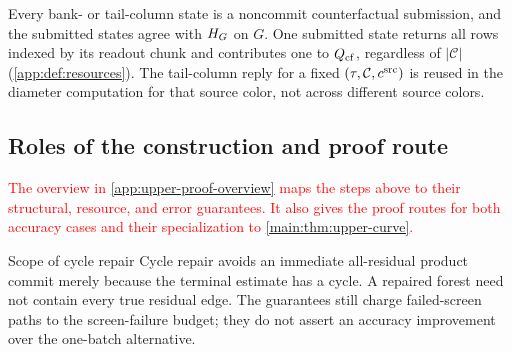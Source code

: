 Every bank- or tail-column state is a noncommit counterfactual submission, and the
submitted states agree with $H_{G}$ on $G$.  One submitted state returns all
rows indexed by its readout chunk and contributes one to
$Q_{\mathrm{cf}}$, regardless of $|\mathcal C|$
(\textcolor{red}{\cref{app:def:resources}}). The
tail-column reply for a fixed $(\tau,\mathcal C,c^{\mathrm{src}})$ is reused in the
diameter computation for that source color, not across different source colors.

\subsection{Roles of the construction and proof route}
\label{app:algorithm-proof-route}

\textcolor{red}{The overview in \cref{app:upper-proof-overview} maps the steps above
to their structural, resource, and error guarantees. It also gives the proof
routes for both accuracy cases and their specialization to
\cref{main:thm:upper-curve}.}

\begin{proposalcontext}{Scope of cycle repair}
Cycle repair avoids an immediate all-residual product commit merely because
the terminal estimate has a cycle. A repaired forest need not contain every
true residual edge. The guarantees still charge failed-screen paths to the
screen-failure budget; they do not assert an accuracy improvement over the
one-batch alternative.
\end{proposalcontext}
